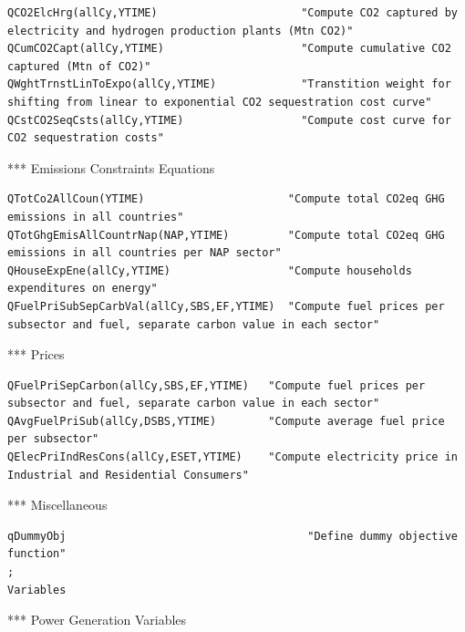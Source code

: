 \documentclass[a4paper,]{scrartcl}
\begin{document}
\begin{lstlisting}
QCO2ElcHrg(allCy,YTIME)                      "Compute CO2 captured by electricity and hydrogen production plants (Mtn CO2)"
QCumCO2Capt(allCy,YTIME)                     "Compute cumulative CO2 captured (Mtn of CO2)"
QWghtTrnstLinToExpo(allCy,YTIME)             "Transtition weight for shifting from linear to exponential CO2 sequestration cost curve"
QCstCO2SeqCsts(allCy,YTIME)                  "Compute cost curve for CO2 sequestration costs"   
\end{lstlisting}

*** Emissions Constraints Equations

\begin{lstlisting}
QTotCo2AllCoun(YTIME)                      "Compute total CO2eq GHG emissions in all countries"
QTotGhgEmisAllCountrNap(NAP,YTIME)         "Compute total CO2eq GHG emissions in all countries per NAP sector"  
QHouseExpEne(allCy,YTIME)                  "Compute households expenditures on energy"
QFuelPriSubSepCarbVal(allCy,SBS,EF,YTIME)  "Compute fuel prices per subsector and fuel, separate carbon value in each sector"
\end{lstlisting}

*** Prices

\begin{lstlisting}
QFuelPriSepCarbon(allCy,SBS,EF,YTIME)   "Compute fuel prices per subsector and fuel, separate carbon value in each sector"  
QAvgFuelPriSub(allCy,DSBS,YTIME)        "Compute average fuel price per subsector"  
QElecPriIndResCons(allCy,ESET,YTIME)    "Compute electricity price in Industrial and Residential Consumers" 
\end{lstlisting}

*** Miscellaneous

\begin{lstlisting}
qDummyObj                                     "Define dummy objective function"
;
Variables
\end{lstlisting}

*** Power Generation Variables
\end{document}

